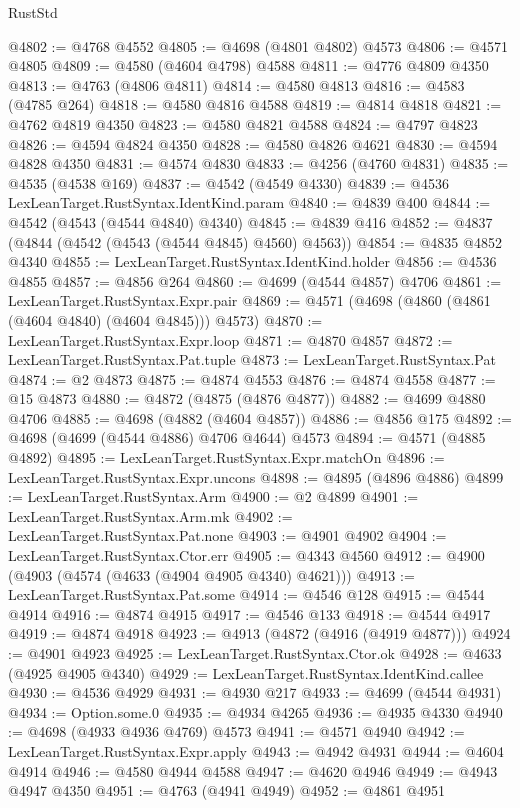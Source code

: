 \begin{lexlean}{RustStd}
\begin{coremodule}
@4802 := @4768 @4552
@4805 := @4698 (@4801 @4802) @4573
@4806 := @4571 @4805
@4809 := @4580 (@4604 @4798) @4588
@4811 := @4776 @4809 @4350
@4813 := @4763 (@4806 @4811)
@4814 := @4580 @4813
@4816 := @4583 (@4785 @264)
@4818 := @4580 @4816 @4588
@4819 := @4814 @4818
@4821 := @4762 @4819 @4350
@4823 := @4580 @4821 @4588
@4824 := @4797 @4823
@4826 := @4594 @4824 @4350
@4828 := @4580 @4826 @4621
@4830 := @4594 @4828 @4350
@4831 := @4574 @4830
@4833 := @4256 (@4760 @4831)
@4835 := @4535 (@4538 @169)
@4837 := @4542 (@4549 @4330)
@4839 := @4536 LexLeanTarget.RustSyntax.IdentKind.param
@4840 := @4839 @400
@4844 := @4542 (@4543 (@4544 @4840) @4340)
@4845 := @4839 @416
@4852 := @4837 (@4844 (@4542 (@4543 (@4544 @4845) @4560) @4563))
@4854 := @4835 @4852 @4340
@4855 := LexLeanTarget.RustSyntax.IdentKind.holder
@4856 := @4536 @4855
@4857 := @4856 @264
@4860 := @4699 (@4544 @4857) @4706
@4861 := LexLeanTarget.RustSyntax.Expr.pair
@4869 := @4571 (@4698 (@4860 (@4861 (@4604 @4840) (@4604 @4845))) @4573)
@4870 := LexLeanTarget.RustSyntax.Expr.loop
@4871 := @4870 @4857
@4872 := LexLeanTarget.RustSyntax.Pat.tuple
@4873 := LexLeanTarget.RustSyntax.Pat
@4874 := @2 @4873
@4875 := @4874 @4553
@4876 := @4874 @4558
@4877 := @15 @4873
@4880 := @4872 (@4875 (@4876 @4877))
@4882 := @4699 @4880 @4706
@4885 := @4698 (@4882 (@4604 @4857))
@4886 := @4856 @175
@4892 := @4698 (@4699 (@4544 @4886) @4706 @4644) @4573
@4894 := @4571 (@4885 @4892)
@4895 := LexLeanTarget.RustSyntax.Expr.matchOn
@4896 := LexLeanTarget.RustSyntax.Expr.uncons
@4898 := @4895 (@4896 @4886)
@4899 := LexLeanTarget.RustSyntax.Arm
@4900 := @2 @4899
@4901 := LexLeanTarget.RustSyntax.Arm.mk
@4902 := LexLeanTarget.RustSyntax.Pat.none
@4903 := @4901 @4902
@4904 := LexLeanTarget.RustSyntax.Ctor.err
@4905 := @4343 @4560
@4912 := @4900 (@4903 (@4574 (@4633 (@4904 @4905 @4340) @4621)))
@4913 := LexLeanTarget.RustSyntax.Pat.some
@4914 := @4546 @128
@4915 := @4544 @4914
@4916 := @4874 @4915
@4917 := @4546 @133
@4918 := @4544 @4917
@4919 := @4874 @4918
@4923 := @4913 (@4872 (@4916 (@4919 @4877)))
@4924 := @4901 @4923
@4925 := LexLeanTarget.RustSyntax.Ctor.ok
@4928 := @4633 (@4925 @4905 @4340)
@4929 := LexLeanTarget.RustSyntax.IdentKind.callee
@4930 := @4536 @4929
@4931 := @4930 @217
@4933 := @4699 (@4544 @4931)
@4934 := Option.some.{0}
@4935 := @4934 @4265
@4936 := @4935 @4330
@4940 := @4698 (@4933 @4936 @4769) @4573
@4941 := @4571 @4940
@4942 := LexLeanTarget.RustSyntax.Expr.apply
@4943 := @4942 @4931
@4944 := @4604 @4914
@4946 := @4580 @4944 @4588
@4947 := @4620 @4946
@4949 := @4943 @4947 @4350
@4951 := @4763 (@4941 @4949)
@4952 := @4861 @4951

\end{coremodule}
\end{lexlean}
